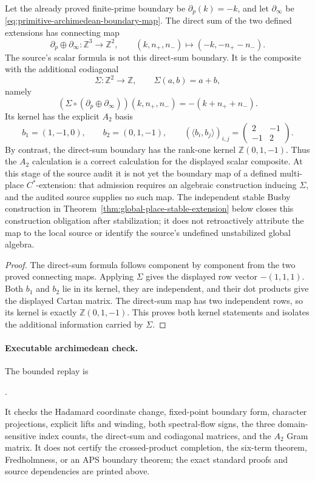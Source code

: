 \begin{proposition}
\label{prop:primitive-global-codiagonal}
Let the already proved finite-prime boundary be
$\partial_p(k)=-k$, and let $\partial_\infty$ be
\eqref{eq:primitive-archimedean-boundary-map}.  The direct sum of the two
defined extensions has connecting map
\[
 \partial_p\oplus\partial_\infty:
 \mathbb Z^3\longrightarrow\mathbb Z^2,\qquad
 (k,n_+,n_-)\longmapsto(-k,-n_+-n_-).
\]
The source's scalar formula is not this direct-sum boundary.  It is the
composite with the additional codiagonal
\[
 \Sigma:\mathbb Z^2\to\mathbb Z,\qquad \Sigma(a,b)=a+b,
\]
namely
\[
 (\Sigma\circ(\partial_p\oplus\partial_\infty))(k,n_+,n_-)
 =-(k+n_++n_-).
\]
Its kernel has the explicit $A_2$ basis
\[
 b_1=(1,-1,0),\qquad b_2=(0,1,-1),\qquad
 (\langle b_i,b_j\rangle)_{i,j}
 =\begin{pmatrix}2&-1\\-1&2\end{pmatrix}.
\]
By contrast, the direct-sum boundary has the rank-one kernel
$\mathbb Z(0,1,-1)$.  Thus the $A_2$ calculation is a correct calculation for
the displayed scalar composite.  At this stage of the source audit it is not
yet the boundary map of a defined multi-place $C^*$-extension: that admission
requires an algebraic construction inducing $\Sigma$, and the audited source
supplies no such map.  The independent stable Busby construction in
Theorem~\ref{thm:global-place-stable-extension} below closes this construction
obligation after stabilization; it does not retroactively attribute the map to
the local source or identify the source's undefined unstabilized global algebra.
\end{proposition}

\begin{proof}
The direct-sum formula follows component by component from the two proved
connecting maps.  Applying $\Sigma$ gives the displayed row vector
$-(1,1,1)$.  Both $b_1$ and $b_2$ lie in its kernel, they are independent, and
their dot products give the displayed Cartan matrix.  The direct-sum map has
two independent rows, so its kernel is exactly
$\mathbb Z(0,1,-1)$.  This proves both kernel statements and isolates the
additional information carried by $\Sigma$.
\end{proof}

\paragraph{Executable archimedean check.}
The bounded replay is
\begin{center}
\footnotesize
{}.
\end{center}
It checks the Hadamard coordinate change, fixed-point boundary form, character
projections, explicit lifts and winding, both spectral-flow signs, the three
domain-sensitive index counts, the direct-sum and codiagonal matrices, and the
$A_2$ Gram matrix.  It does not certify the crossed-product completion, the
six-term theorem, Fredholmness, or an APS boundary theorem; the exact standard
proofs and source dependencies are printed above.

